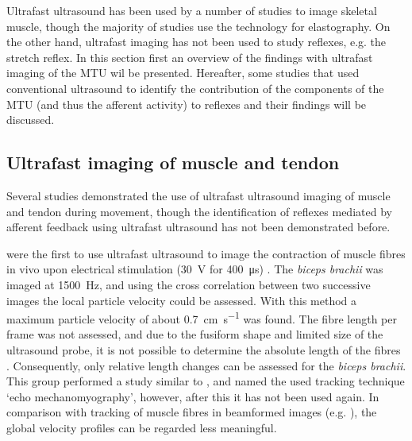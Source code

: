 Ultrafast ultrasound has been used by a number of studies to image skeletal muscle, though the majority of studies use the technology for elastography. On the other hand, ultrafast imaging has not been used to study reflexes, e.g. the stretch reflex. In this section first an overview of the findings with ultrafast imaging of the MTU wil be presented. Hereafter, some studies that used conventional ultrasound to identify the contribution of the components of the MTU (and thus the afferent activity) to reflexes and their findings will be discussed. %


\subsection{Ultrafast imaging of muscle and tendon}

Several studies demonstrated the use of ultrafast ultrasound imaging of muscle and tendon during movement, though the identification of reflexes mediated by afferent feedback using ultrafast ultrasound has not been demonstrated before. 

\citeauthor{deffieux_ultrafast_2006} were the first to use ultrafast ultrasound to image the contraction of muscle fibres in vivo upon electrical stimulation (\SI{30}{\volt} for \SI{400}{\micro\second}) \cite{deffieux_ultrafast_2006}. The \textit{biceps brachii} was imaged at \SI{1500}{\hertz}, and using the cross correlation between two successive images the local particle velocity could be assessed. With this method a maximum particle velocity of about \SI{0.7}{\centi\meter\per\second} was found. The fibre length per frame was not assessed, and due to the fusiform shape and limited size of the ultrasound probe, it is not possible to determine the absolute length of the fibres \cite{hodges_measurement_2003}. Consequently, only relative length changes can be assessed for the \textit{biceps brachii}. This group performed a study similar to \cite{deffieux_ultrafast_2006}, and named the used tracking technique `echo mechanomyography', however, after this it has not been used again. In comparison with tracking of muscle fibres in beamformed images (e.g. \cite{farris_ultratrack_2016}), the global velocity profiles can be regarded less meaningful. 


